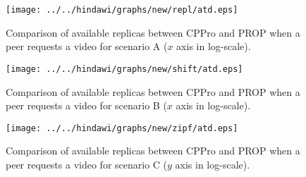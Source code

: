 
\begin{figure}[!t]
\begin{center}
\texttt{[image: ../../hindawi/graphs/new/repl/atd.eps]}
\end{center}
\caption{Comparison of available replicas between CPPro and PROP when a peer requests a video for scenario A ($x$ axis in log-scale).}
\label{fig:atd-normal}
\end{figure}

\begin{figure}[!t]
\begin{center}
\texttt{[image: ../../hindawi/graphs/new/shift/atd.eps]}
\end{center}
\caption{Comparison of available replicas between CPPro and PROP when a peer requests a video for scenario B ($x$ axis in log-scale).}
\label{fig:atd-shift}
\end{figure}

\begin{figure}[!t]
\begin{center}
\texttt{[image: ../../hindawi/graphs/new/zipf/atd.eps]}
\end{center}
\caption{Comparison of available replicas between CPPro and PROP when a peer requests a video for scenario C ($y$ axis in log-scale). }
\label{fig:atd-zipf}
\end{figure}











